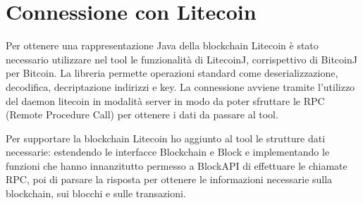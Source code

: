 \section{Connessione con Litecoin}
Per ottenere una rappresentazione Java della blockchain Litecoin è stato necessario utilizzare nel tool le funzionalità di LitecoinJ, corrispettivo di BitcoinJ per Bitcoin. La libreria permette operazioni standard come deserializzazione, decodifica, decriptazione indirizzi e key.
La connessione avviene tramite l’utilizzo del daemon litecoin in modalità server in modo da poter sfruttare le RPC (Remote Procedure Call) per ottenere i dati da passare al tool.

Per supportare la blockchain Litecoin ho aggiunto al tool le strutture dati necessarie: estendendo le interfacce Blockchain e Block e implementando le funzioni che hanno innanzitutto permesso a BlockAPI di effettuare le chiamate RPC, poi di parsare la risposta per ottenere le informazioni necessarie sulla blockchain, sui blocchi e sulle transazioni.


